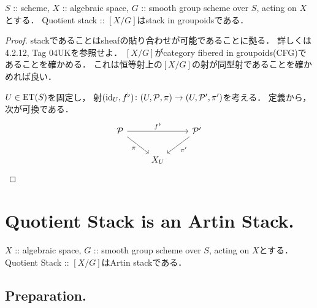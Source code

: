     \begin{Lemma}
        $S$ :: scheme,
        $X$ :: algebraic space,
        $G$ :: smooth group scheme over $S$, acting on $X$とする．
        Quotient stack :: $[X/G]$はstack in groupoidsである．
    \end{Lemma}
    \begin{proof}
        stackであることはsheafの貼り合わせが可能であることに拠る．
        詳しくは\cite{Olsson16} 4.2.12, \cite{SP} Tag 04UKを参照せよ．
        $[X/G]$がcategory fibered in groupoids(CFG)であることを確かめる．
        これは恒等射上の$[X/G]$の射が同型射であることを確かめれば良い．

        $U \in \ET(S)$を固定し，
        射$(\id[U], f^{\flat}) \colon (U, \shP, \pi) \to (U, \shP', \pi')$を考える．
        定義から，次が可換である．
        \[
            \begin{tikzcd}[row sep=20pt]
            \shP \ar[rr, "f^{\flat}"]\ar[rd, "\pi"']& {} & \shP' \ar[ld, "\pi'"]\\
            {} & X_{U} & {}
        \end{tikzcd}
        \]
    \end{proof}

\section{Quotient Stack is an Artin Stack.}
\begin{Thm}
    $X$ :: algebraic space,
    $G$ :: smooth group scheme over $S$, acting on $X$とする．
    Quotient Stack :: $[X/G]$はArtin stackである．
\end{Thm}

\subsection{Preparation.}
